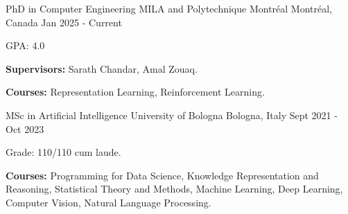 

\begin{cventries}

 
 \begin{comment}
 \cventry
    {PhD in Computer Engineering} %
    {MILA and Polytechnique Montreal} %
    {Montreal, Canada} %
    {Aug 2024 - Present} %
    {
      \begin{cvitems} %
        \item {\textbf{Supervised by:} Sarath Chandar and Anbil Parthipan.}
      \end{cvitems}
    }
    \end{comment}
 
    \cventry
    {PhD in Computer Engineering} %
    {MILA and Polytechnique Montréal} %
    {Montréal, Canada} %
    {Jan 2025 - Current} %
    {
      \begin{cvitems} %
        \item  {GPA: 4.0}
        \item {\textbf{Supervisors:} Sarath Chandar, Amal Zouaq.}
        \item {\textbf{Courses:} Representation Learning, Reinforcement Learning.}
      \end{cvitems}
    }
    
    \cventry
    {MSc in Artificial Intelligence} %
    {University of Bologna} %
    {Bologna, Italy} %
    {Sept 2021 - Oct 2023} %
    {
      \begin{cvitems} %
        \item  {Grade: 110/110 cum laude.}
        \item {\textbf{Courses:} Programming for Data Science, Knowledge Representation and Reasoning, Statistical Theory and Methods, Machine Learning, Deep Learning, Computer Vision, Natural Language Processing.}
      \end{cvitems}
    }
    

\end{cventries}
